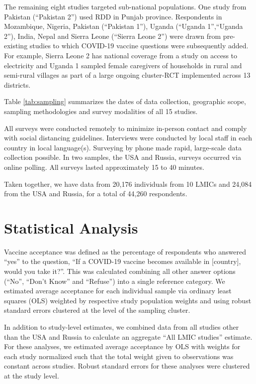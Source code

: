 \documentclass[
  12pt,
]{article}
\begin{document}
The remaining eight studies targeted sub-national populations. One study from Pakistan (``Pakistan 2'') used RDD in Punjab province. Respondents in Mozambique, Nigeria, Pakistan (``Pakistan 1''), Uganda (``Uganda 1'',``Uganda 2''), India, Nepal and Sierra Leone (``Sierra Leone 2'') were drawn from pre-existing studies to which COVID-19 vaccine questions were subsequently added. For example, Sierra Leone 2 has national coverage from a study on access to electricity and Uganda 1 sampled female caregivers of households in rural and semi-rural villages as part of a large ongoing cluster-RCT implemented across 13 districts.

Table \ref{tab:sampling} summarizes the dates of data collection, geographic scope, sampling methodologies and survey modalities of all 15 studies.

All surveys were conducted remotely to minimize in-person contact and comply with social distancing guidelines. Interviews were conducted by local staff in each country in local language(s). Surveying by phone made rapid, large-scale data collection possible. In two samples, the USA and Russia, surveys occurred via online polling. All surveys lasted approximately 15 to 40 minutes.

Taken together, we have data from 20,176 individuals from 10 LMICs and 24,084 from the USA and Russia, for a total of 44,260 respondents.

\hypertarget{statistical-analysis}{%
\section*{Statistical Analysis}\label{statistical-analysis}}

Vaccine acceptance was defined as the percentage of respondents who answered ``yes'' to the question, ``If a COVID-19 vaccine becomes available in {[}country{]}, would you take it?''. This was calculated combining all other answer options (``No'', ``Don't Know'' and ``Refuse'') into a single reference category. We estimated average acceptance for each individual sample via ordinary least squares (OLS) weighted by respective study population weights and using robust standard errors clustered at the level of the sampling cluster.

In addition to study-level estimates, we combined data from all studies other than the USA and Russia to calculate an aggregate ``All LMIC studies'' estimate. For these analyses, we estimated average acceptance by OLS with weights for each study normalized such that the total weight given to observations was constant across studies. Robust standard errors for these analyses were clustered at the study level.
\end{document}
